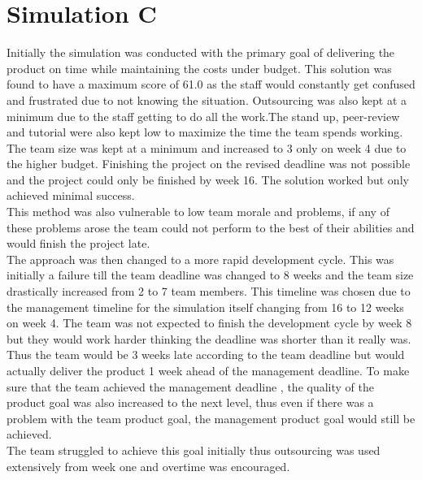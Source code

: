 \documentclass{article}
\begin{document}
\section{Simulation C}
Initially the simulation was conducted with the primary goal of delivering the product on time while maintaining the costs under budget. This solution was found to have a maximum score of 61.0 as the staff would constantly get confused and frustrated due to not knowing the situation. Outsourcing was also kept at a minimum due to the staff getting to do all the work.The stand up, peer-review and tutorial were also kept low to maximize the time the team spends working. The team size was kept at a minimum and increased to 3 only on week 4 due to the higher budget. Finishing the project on the revised deadline was not possible and the project could only be finished by week 16. The solution worked but only achieved minimal success. \\
This method was also vulnerable to low team morale and problems, if any of these problems arose the team could not perform to the best of their abilities and would finish the project late.
\\
The approach was then changed to a more rapid development cycle. This was initially a failure till the team deadline was changed to 8 weeks and the team size drastically increased from 2 to 7 team members. This timeline was chosen due to the management timeline for the simulation itself changing from 16 to 12 weeks on week 4. The team was not expected to finish the development cycle by week 8 but they would work harder thinking the deadline was shorter than it really was. Thus the team would be 3 weeks late according to the team deadline but would actually deliver the product 1 week ahead of the management deadline. To make sure that the team achieved the management deadline , the quality of the product goal was also increased to the next level, thus even if there was a problem with the team product goal, the management product goal would still be achieved.\\
The team struggled to achieve this goal initially thus outsourcing was used extensively from week one and overtime was encouraged. \\
\end{document}
